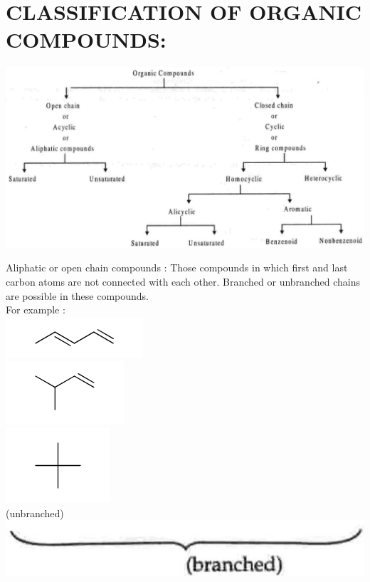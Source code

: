 \documentclass[10pt]{article}
\begin{document}
\section*{CLASSIFICATION OF ORGANIC COMPOUNDS:}
\begin{center}
\includegraphics[max width=\textwidth]{2025_01_28_8470952b98110cec3aabg-007(2)}
\end{center}

Aliphatic or open chain compounds : Those compounds in which first and last carbon atoms are not connected with each other. Branched or unbranched chains are possible in these compounds.\\
For example :\\
\includegraphics{smile-4d35931270aae4e49a9ba7f56de7f2ac85550e62}\\
\includegraphics{smile-b3cab2cff8c2699cc45fe98b10f58bec3cf0d742}\\
\includegraphics{smile-97a92a886a7faa7c96c9698b5f061d0f3c2713fb}\\
(unbranched)\\
\includegraphics[max width=\textwidth, center]{2025_01_28_8470952b98110cec3aabg-007(1)}
\end{document}
